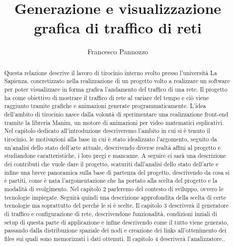 \documentclass[binding=0.6cm]{sapthesis}
\title{Generazione e visualizzazione grafica di traffico di reti}
\author{Francesco Pannozzo}
\begin{document}
\frontmatter
\maketitle
\dedication{Dedicato alla\\ mia famiglia}
\begin{abstract}
Questa relazione descrive il lavoro di tirocinio interno svolto presso l'università La Sapienza, 
concretizzato nella realizzazione 
di un progetto volto a realizzare un software per poter visualizzare in forma grafica l'andamento 
del traffico di una rete.
Il progetto ha come obiettivo di mostrare il traffico di rete al variare del tempo e ciò viene raggiunto
tramite grafiche e animazioni generate programmaticamente. L'idea dell'ambito di tirocinio nasce 
dalla volontà di sperimentare una realizzazione front-end tramite la libreria Manim, un motore di animazioni per video
matematici esplicativi. Nel capitolo dedicato all'introduzione descriveremo l'ambito in cui si è tenuto il tirocinio, le motivazioni
alla base in cui è stato idealizzato l'argomento, seguito da un'analisi dello stato dell'arte attuale, descrivendo diverse realtà affini al progetto
e studiandone caratteristiche, i loro pregi e mancanze. A seguire ci sarà una descrizione dei contributi che vuole dare il progetto, scaturiti dall'analisi
dello stato dell'arte e infine una breve panoramica sulla base di partenza del progetto, descrivendo da cosa si è partiti, come è nata l'argomentazione
che ha portato alla scelta del progetto e la modalità di svolgimento. Nel capitolo 2 parleremo del contesto di sviluppo, ovvero le tecnologie impiegate.
Seguirà quindi una descrizione approfondita della scelta di certe tecnologie ma soprattutto del perchè le si è scelte. Il capitolo 3
descriverà il generatore di traffico e configurazione di rete, descrivendone funzionalità, condizioni inziali di setup di questa parte di applicazione e infine
descrivendo come il tutto viene generato, passando dalla distribuzione spaziale dei nodi e creazione dei links all'ottenimento dei files sui quali sono memorizzati i dati ottenuti.
Il capitolo 4 descriverà l'analizzatore..

\end{abstract}
\tableofcontents
\mainmatter
\end{document}
